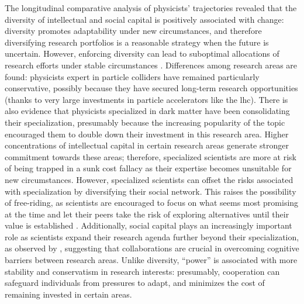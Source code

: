 \documentclass{article}
\begin{document}
The longitudinal comparative analysis of physicists' trajectories revealed that the diversity of intellectual and social capital is positively associated with change: diversity promotes adaptability under new circumstances, and therefore diversifying research portfolios is a reasonable strategy when the future is uncertain. However, enforcing diversity can lead to suboptimal allocations of research efforts under stable circumstances \citep{Schimmelpfennig2021}. Differences among research areas are found: physicists expert in particle colliders have remained particularly conservative, possibly because they have secured long-term research opportunities (thanks to very large investments in particle accelerators like the \gls{lhc}). There is also evidence that physicists specialized in dark matter have been consolidating their specialization, presumably because the increasing popularity of the topic encouraged them to double down their investment in this research area. Higher concentrations of intellectual capital in certain research areas generate stronger commitment towards these areas; therefore, specialized scientists are more at risk of being trapped in a sunk cost fallacy as their expertise becomes unsuitable for new circumstances. However, specialized scientists can offset the risks associated with specialization by diversifying their social network. This raises the possibility of free-riding, as scientists are encouraged to focus on what seems most promising at the time and let their peers take the risk of exploring alternatives until their value is established \citep{Kummerfeld2016}. Additionally, social capital plays an increasingly important role as scientists expand their research agenda further beyond their specialization, as observed by \citealt{Tripodi2020}, suggesting that collaborations are crucial in overcoming cognitive barriers between research areas. Unlike diversity, ``power'' is associated with more stability and conservatism in research interests: presumably, cooperation can safeguard individuals from pressures to adapt, and minimizes the cost of remaining invested in certain areas. %

\end{document}
